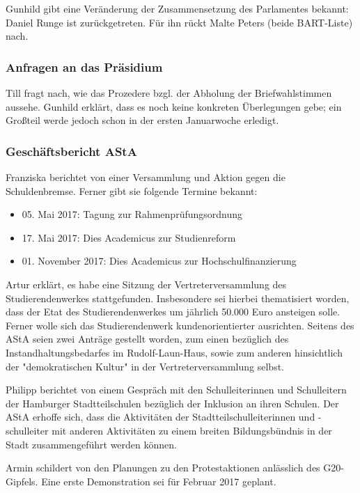 \documentclass[ngerman,headheight=70pt]{scrartcl}
\begin{document}
    Gunhild gibt eine Veränderung der Zusammensetzung des Parlamentes bekannt:
    Daniel Runge ist zurückgetreten. Für ihn rückt Malte Peters (beide BART-Liste)
    nach.

    \subsubsection{Anfragen an das Präsidium}

    Till fragt nach, wie das Prozedere bzgl. der Abholung der Briefwahlstimmen
    aussehe.
    Gunhild erklärt, dass es noch keine konkreten Überlegungen gebe; ein Großteil
    werde jedoch schon in der ersten Januarwoche erledigt.

    \subsubsection{Geschäftsbericht AStA}

    Franziska berichtet von einer Versammlung und Aktion gegen die Schuldenbremse.
    Ferner gibt sie folgende Termine bekannt:
    \begin{itemize}
        \item 05. Mai 2017: Tagung zur Rahmenprüfungsordnung
        \item 17. Mai 2017: Dies Academicus zur Studienreform
        \item 01. November 2017: Dies Academicus zur Hochschulfinanzierung
    \end{itemize}

    Artur erklärt, es habe eine Sitzung der Vertreterversammlung des
    Studierendenwerkes stattgefunden. Insbesondere sei hierbei thematisiert worden,
    dass der Etat des Studierendenwerkes um jährlich 50.000 Euro ansteigen solle.
    Ferner wolle sich das Studierendenwerk kundenorientierter ausrichten. Seitens
    des AStA seien zwei Anträge gestellt worden, zum einen bezüglich des
    Instandhaltungsbedarfes im Rudolf-Laun-Haus, sowie zum anderen hinsichtlich
    der "demokratischen Kultur" in der Vertreterversammlung selbst.

    Philipp berichtet von einem Gespräch mit den Schulleiterinnen und Schulleitern
    der Hamburger Stadtteilschulen bezüglich der Inklusion an ihren Schulen. Der
    AStA erhoffe sich, dass die Aktivitäten der Stadtteilschulleiterinnen und
    -schulleiter mit anderen Aktivitäten zu einem breiten Bildungsbündnis in der
    Stadt zusammengeführt werden können.

    Armin schildert von den Planungen zu den Protestaktionen anlässlich des
    G20-Gipfels. Eine erste Demonstration sei für Februar 2017 geplant.
\end{document}
